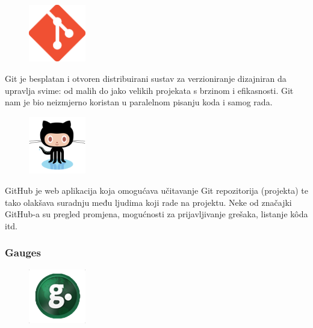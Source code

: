 \documentclass[11pt]{scrreprt}
\begin{document}
\begin{figure}
  \vspace{-10pt}
  \includegraphics[width=2.5cm]{logos/git}
  \vspace{-30pt}
\end{figure}

Git je besplatan i otvoren distribuirani sustav za verzioniranje dizajniran da
upravlja svime: od malih do jako velikih projekata s brzinom i
efikasnosti.\cite{git} Git nam je bio neizmjerno koristan u paralelnom pisanju
koda i samog rada.

\begin{figure}
  \vspace{-10pt}
  \includegraphics[width=2.5cm]{logos/github}
  \vspace{-30pt}
\end{figure}

GitHub je web aplikacija koja omogućava učitavanje Git repozitorija (projekta)
te tako olakšava suradnju među ljudima koji rade na projektu.\cite{github} Neke
od značajki GitHub-a su pregled promjena, mogućnosti za prijavljivanje grešaka,
listanje kôda itd.

\subsubsection{Gauges}

\begin{figure}
  \vspace{-10pt}
  \includegraphics[width=2.5cm]{logos/gauges}
  \vspace{-30pt}
\end{figure}
\end{document}
